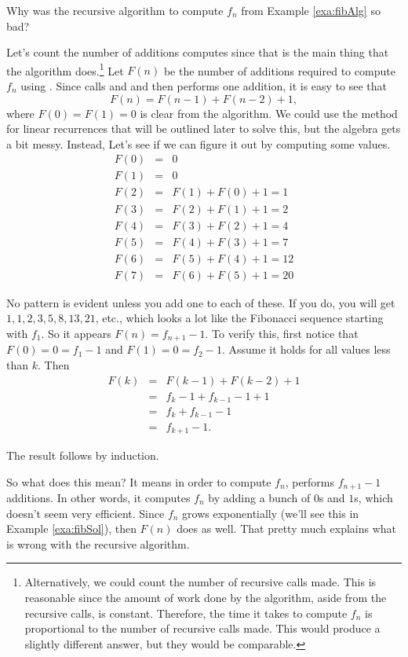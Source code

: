 \newpage
\begin{exa}
Why was the recursive algorithm to compute $f_n$ from Example \ref{exa:fibAlg} so bad?
\begin{sol}
Let's count the number of additions  computes since that is the main
thing that the algorithm does.\footnote{Alternatively, we could count the number of recursive calls made.
This is reasonable since the amount of work done by the algorithm, aside from the recursive calls,
is constant.  Therefore, the time it takes to compute $f_n$ is proportional to 
the number of recursive calls made.
This would produce a slightly different answer, but they would be comparable.}
Let $F(n)$ be the number of additions required to compute $f_n$ using .
Since  calls  and 
and then performs one addition,
it is easy to see that 
$$F(n)=F(n-1)+F(n-2)+1,$$
where $F(0)=F(1)=0$ is clear from the algorithm.
We could use the method for linear recurrences that will be outlined later to solve this, 
but the algebra gets a bit messy.  
Instead, Let's see if we can figure it out by computing some values.
\begin{eqnarray*}
F(0)&=&0\\
F(1)&=&0\\
F(2)&=&F(1)+F(0)+1 = 1\\
F(3)&=&F(2)+F(1)+1 = 2\\
F(4)&=&F(3)+F(2)+1 = 4\\
F(5)&=&F(4)+F(3)+1 = 7\\
F(6)&=&F(5)+F(4)+1 = 12\\
F(7)&=&F(6)+F(5)+1 = 20
\end{eqnarray*}

No pattern is evident unless you add one to each of these. If you do, you will
get $1,1,2,3,5,8,13,21$, etc., which looks a lot like the Fibonacci sequence starting with
$f_1$.  So it appears $F(n)=f_{n+1}-1$.
To verify this, first notice that $F(0)=0=f_1-1$ and $F(1)=0=f_2-1$.
Assume it holds for all values less than $k$.
Then
\begin{eqnarray*}
F(k)&=&F(k-1)+F(k-2)+1\\
&=&f_{k}-1+f_{k-1}-1 + 1\\
&=&f_{k}+f_{k-1} -1\\
&=&f_{k+1}-1.
\end{eqnarray*}

\noindent
The result follows by induction.

So what does this mean?  It means in order to compute $f_n$, 
 performs $f_{n+1}-1$ additions.
In other words, it computes $f_n$ by adding a bunch of $0$s and $1$s,
which doesn't seem very efficient.  
Since $f_n$ grows exponentially (we'll see this in Example \ref{exa:fibSol}),
then $F(n)$ does as well.  That pretty much explains what is wrong with the recursive algorithm.
\end{sol}

\end{exa}

